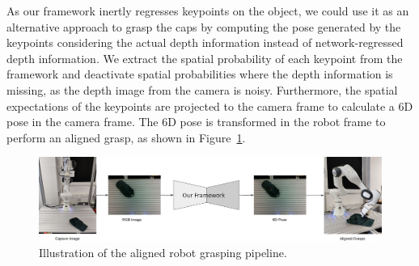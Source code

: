 As our framework inertly regresses keypoints on the object, we could use it as an alternative approach to grasp the caps by computing the pose
generated by the keypoints considering the actual depth information instead of network-regressed depth information.
We extract the spatial probability of each keypoint from the framework and deactivate spatial probabilities where the depth information is missing,
as the depth image from the camera is noisy. Furthermore, the spatial expectations of the keypoints are projected to the camera frame
to calculate a 6D pose in the camera frame. The 6D pose is transformed in the robot frame to perform an aligned grasp, as shown in Figure~\ref{fig:aligned_grasp}.

\begin{figure}[htb]
    \centering
    \includegraphics[scale=0.235]{images/aligned.png}
    \caption{Illustration of the aligned robot grasping pipeline.}
    \label{fig:aligned_grasp}
\end{figure}

